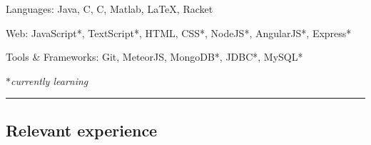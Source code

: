 \documentclass[10pt,letterpaper]{article}
\newenvironment{indentsection}[1]%
{\begin{list}{}%
	{\setlength{\leftmargin}{#1}}%
	\item[]%
}
{\end{list}}
\newcommand{\CPP}
{C\nolinebreak[4]\hspace{-.05em}\raisebox{.22ex}{\footnotesize\bf ++}}
\begin{document}

\begin{indentsection}{\parindent}
\begin{description*}
	\item[Languages:]
	Java, C, \CPP, Matlab, \LaTeX*, Racket
	\item[Web:]
	JavaScript*, TextScript*, HTML, CSS*, NodeJS*, AngularJS*, Express*
	\item[Tools \& Frameworks:]
	Git, MeteorJS, MongoDB*, JDBC*, MySQL*
\end{description*}
\hfill{\emph{$\ast$currently learning}}
\end{indentsection}


\hrule
\vspace{-0.4em}

\subsection*{Relevant experience}
\end{document}
